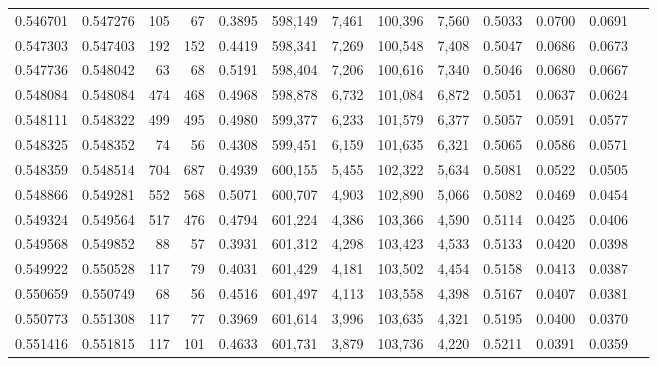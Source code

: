 \begin{tabular}{rrrrrrrrrrrrr}
0.546701 & 0.547276 &   105 &    67 &                                     0.3895 & 598,149 &   7,461 & 100,396 &   7,560 & 0.5033 & 0.0700 & 0.0691 \\
0.547303 & 0.547403 &   192 &   152 &                                     0.4419 & 598,341 &   7,269 & 100,548 &   7,408 & 0.5047 & 0.0686 & 0.0673 \\
0.547736 & 0.548042 &    63 &    68 &                                     0.5191 & 598,404 &   7,206 & 100,616 &   7,340 & 0.5046 & 0.0680 & 0.0667 \\
0.548084 & 0.548084 &   474 &   468 &                                     0.4968 & 598,878 &   6,732 & 101,084 &   6,872 & 0.5051 & 0.0637 & 0.0624 \\
0.548111 & 0.548322 &   499 &   495 &                                     0.4980 & 599,377 &   6,233 & 101,579 &   6,377 & 0.5057 & 0.0591 & 0.0577 \\
0.548325 & 0.548352 &    74 &    56 &                                     0.4308 & 599,451 &   6,159 & 101,635 &   6,321 & 0.5065 & 0.0586 & 0.0571 \\
0.548359 & 0.548514 &   704 &   687 &                                     0.4939 & 600,155 &   5,455 & 102,322 &   5,634 & 0.5081 & 0.0522 & 0.0505 \\
0.548866 & 0.549281 &   552 &   568 &                                     0.5071 & 600,707 &   4,903 & 102,890 &   5,066 & 0.5082 & 0.0469 & 0.0454 \\
0.549324 & 0.549564 &   517 &   476 &                                     0.4794 & 601,224 &   4,386 & 103,366 &   4,590 & 0.5114 & 0.0425 & 0.0406 \\
0.549568 & 0.549852 &    88 &    57 &                                     0.3931 & 601,312 &   4,298 & 103,423 &   4,533 & 0.5133 & 0.0420 & 0.0398 \\
0.549922 & 0.550528 &   117 &    79 &                                     0.4031 & 601,429 &   4,181 & 103,502 &   4,454 & 0.5158 & 0.0413 & 0.0387 \\
0.550659 & 0.550749 &    68 &    56 &                                     0.4516 & 601,497 &   4,113 & 103,558 &   4,398 & 0.5167 & 0.0407 & 0.0381 \\
0.550773 & 0.551308 &   117 &    77 &                                     0.3969 & 601,614 &   3,996 & 103,635 &   4,321 & 0.5195 & 0.0400 & 0.0370 \\
0.551416 & 0.551815 &   117 &   101 &                                     0.4633 & 601,731 &   3,879 & 103,736 &   4,220 & 0.5211 & 0.0391 & 0.0359 \\

\end{tabular}
